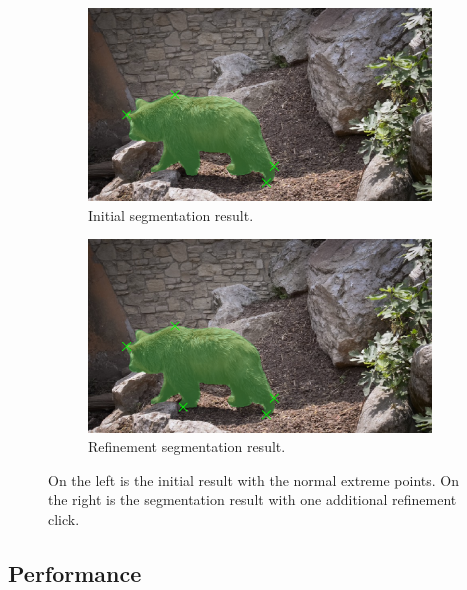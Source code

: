 \begin{figure} [!b]
	\centering
	\begin{subfigure}[b]{0.45\textwidth}
		\centering
		\includegraphics[width=\textwidth]{figures/chap33_bear_initial_result.png}
		\caption{Initial segmentation result.}
		\label{fig:ch3:sec3:refinement_1}
	\end{subfigure}
	\hfill
	\begin{subfigure}[b]{0.45\textwidth}
		\centering
		\includegraphics[width=\textwidth]{figures/chap33_bear_refine_result.png}
		\caption{Refinement segmentation result.}
		\label{fig:ch3:sec3:refinement_2}
	\end{subfigure}
	\caption[DEXTR Refinement]{
		On the left is the initial result with the normal extreme points. 
		On the right is the segmentation result with one additional refinement click.
	} \label{fig:ch3:sec3:refinement}
\end{figure}


\subsection{Performance}\label{ord:ch3:sec3:subsec5}

